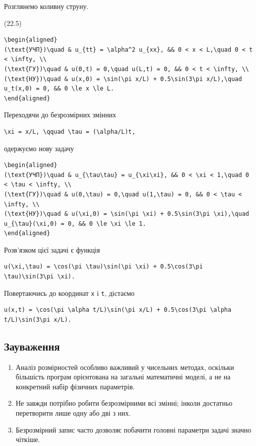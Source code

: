 \documentclass[
  ukrainian,
]{article}
\providecommand{\tightlist}{%
  \setlength{\itemsep}{0pt}\setlength{\parskip}{0pt}}
\begin{document}
Розглянемо коливну струну.

(22.5)

\begin{verbatim}
\begin{aligned}
(\text{УЧП})\quad & u_{tt} = \alpha^2 u_{xx}, && 0 < x < L,\quad 0 < t < \infty, \\
(\text{ГУ})\quad & u(0,t) = 0,\quad u(L,t) = 0, && 0 < t < \infty, \\
(\text{НУ})\quad & u(x,0) = \sin(\pi x/L) + 0.5\sin(3\pi x/L),\quad u_t(x,0) = 0, && 0 \le x \le L.
\end{aligned}
\end{verbatim}

Переходячи до безрозмірних змінних

\begin{verbatim}
\xi = x/L, \qquad \tau = (\alpha/L)t,
\end{verbatim}

одержуємо нову задачу

\begin{verbatim}
\begin{aligned}
(\text{УЧП})\quad & u_{\tau\tau} = u_{\xi\xi}, && 0 < \xi < 1,\quad 0 < \tau < \infty, \\
(\text{ГУ})\quad & u(0,\tau) = 0,\quad u(1,\tau) = 0, && 0 < \tau < \infty, \\
(\text{НУ})\quad & u(\xi,0) = \sin(\pi \xi) + 0.5\sin(3\pi \xi),\quad u_{\tau}(\xi,0) = 0, && 0 \le \xi \le 1.
\end{aligned}
\end{verbatim}

Розв'язком цієї задачі є функція

\begin{verbatim}
u(\xi,\tau) = \cos(\pi \tau)\sin(\pi \xi) + 0.5\cos(3\pi \tau)\sin(3\pi \xi).
\end{verbatim}

Повертаючись до координат \texttt{x} і \texttt{t}, дістаємо

\begin{verbatim}
u(x,t) = \cos(\pi \alpha t/L)\sin(\pi x/L) + 0.5\cos(3\pi \alpha t/L)\sin(3\pi x/L).
\end{verbatim}

\subsection{Зауваження}\label{ux437ux430ux443ux432ux430ux436ux435ux43dux43dux44f}

\begin{enumerate}
\def\labelenumi{\arabic{enumi}.}
\tightlist
\item
  Аналіз розмірностей особливо важливий у чисельних методах, оскільки
  більшість програм орієнтована на загальні математичні моделі, а не на
  конкретний набір фізичних параметрів.
\item
  Не завжди потрібно робити безрозмірними всі змінні; інколи достатньо
  перетворити лише одну або дві з них.
\item
  Безрозмірний запис часто дозволяє побачити головні параметри задачі
  значно чіткіше.
\end{enumerate}
\end{document}
